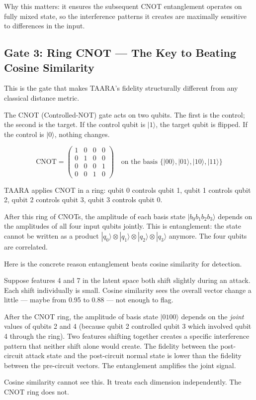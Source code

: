 \documentclass[11pt,a4paper]{article}
\newcommand{\ket}[1]{|#1\rangle}
\begin{document}
Why this matters: it ensures the subsequent CNOT entanglement operates on fully mixed state, so the interference patterns it creates are maximally sensitive to differences in the input.

\subsection{Gate 3: Ring CNOT — The Key to Beating Cosine Similarity}

This is the gate that makes TAARA's fidelity structurally different from any classical distance metric.

The CNOT (Controlled-NOT) gate acts on two qubits. The first is the control; the second is the target. If the control qubit is $\ket{1}$, the target qubit is flipped. If the control is $\ket{0}$, nothing changes.

\[
\text{CNOT} = \begin{pmatrix} 1&0&0&0 \\ 0&1&0&0 \\ 0&0&0&1 \\ 0&0&1&0 \end{pmatrix}
\quad \text{on the basis } \{\ket{00}, \ket{01}, \ket{10}, \ket{11}\}
\]

TAARA applies CNOT in a ring: qubit 0 controls qubit 1, qubit 1 controls qubit 2, qubit 2 controls qubit 3, qubit 3 controls qubit 0.

After this ring of CNOTs, the amplitude of each basis state $\ket{b_0 b_1 b_2 b_3}$ depends on the amplitudes of all four input qubits jointly. This is entanglement: the state cannot be written as a product $\ket{q_0} \otimes \ket{q_1} \otimes \ket{q_2} \otimes \ket{q_3}$ anymore. The four qubits are correlated.

\begin{insight}
Here is the concrete reason entanglement beats cosine similarity for detection.

Suppose features 4 and 7 in the latent space both shift slightly during an attack. Each shift individually is small. Cosine similarity sees the overall vector change a little — maybe from 0.95 to 0.88 — not enough to flag.

After the CNOT ring, the amplitude of basis state $\ket{0100}$ depends on the \textit{joint} values of qubits 2 and 4 (because qubit 2 controlled qubit 3 which involved qubit 4 through the ring). Two features shifting together creates a specific interference pattern that neither shift alone would create. The fidelity between the post-circuit attack state and the post-circuit normal state is lower than the fidelity between the pre-circuit vectors. The entanglement amplifies the joint signal.

Cosine similarity cannot see this. It treats each dimension independently. The CNOT ring does not.
\end{insight}
\end{document}
